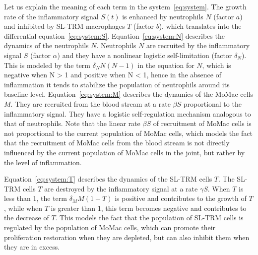 \documentclass[a4paper, 12pt]{article}
\providecommand{\DIFaddtex}[1]{{\protect\color{blue} \sf #1}} %
\providecommand{\DIFdeltex}[1]{{\protect\color{red} \scriptsize #1}} %
\providecommand{\DIFaddbegin}{} %
\providecommand{\DIFaddend}{} %
\providecommand{\DIFdelbegin}{} %
\providecommand{\DIFdelend}{} %
\providecommand{\DIFadd}[1]{\texorpdfstring{\DIFaddtex{#1}}{#1}} %
\providecommand{\DIFdel}[1]{\texorpdfstring{\DIFdeltex{#1}}{}} %
\begin{document}
Let us explain the meaning of each term in the system~\eqref{eq:system}.
The growth rate of the inflammatory signal $S(t)$ is enhanced by neutrophils $N$ (factor $a$) and inhibited by SL-TRM macrophages $T$ (factor $b$), which translates into the differential equation~\eqref{eq:system:S}.
Equation~\eqref{eq:system:N} describes the dynamics of the neutrophils $N$.
 Neutrophils $N$ are recruited by the inflammatory signal $S$ (factor $\alpha$) and they have a nonlinear logistic self-limitation (factor $\delta_N$). This is modeled by the term $\delta_N N (N-1)$ in the equation for $N$,
which is negative when N > 1 and positive when N < 1, hence in the absence of inflammation it tends to stabilize the
population of neutrophils around its baseline level. 
Equation~\eqref{eq:system:M} describes the dynamics of the MoMac cells $M$. They are recruited from the blood stream at a  rate $\beta S$ proportional to the inflammatory signal. They have a logistic self-regulation mechanism analogous to that of neutrophils.
 Note that the linear rate $\beta S$ of recruitment of MoMac cells is not proportional to the current population of MoMac cells, which models the fact that the recruitment of MoMac cells from the blood stream is not directly influenced by the current population of MoMac cells in the joint, but rather by the level of inflammation.

Equation~\eqref{eq:system:T} describes the dynamics of the SL-TRM cells $T$. The SL-TRM cells $T$ are destroyed by the inflammatory signal at a rate $\gamma S$. When $T$ is less than 1, the term $\delta_M M (1-T)$ is positive and contributes to the growth of $T$, while when $T$ is greater than 1, this term becomes negative and contributes to the decrease of $T$. 
This models the fact that the population of SL-TRM cells is regulated by the population of MoMac cells, which can promote their \DIFdelbegin \DIFdel{proliferation }\DIFdelend \DIFaddbegin \DIFadd{restoration }\DIFaddend when they are depleted, but can also inhibit them when they are in excess. 
\end{document}
